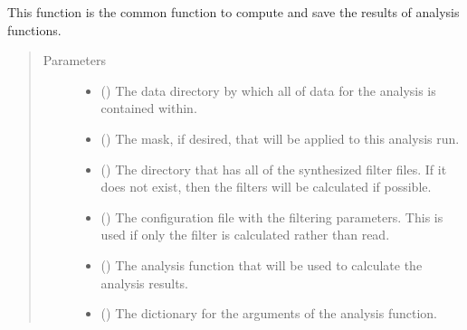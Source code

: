 \documentclass[letterpaper,10pt,english]{sphinxmanual}
\begin{document}
\begin{fulllineitems}
\label{\detokenize{docstrings/ifa_smeargle.analysis.base_functions:ifa_smeargle.analysis.base_functions.create_directory_analysis_files}}
This function is the common function to compute and save the
results of analysis functions.
\begin{quote}\begin{description}
\item[{Parameters}] \leavevmode\begin{itemize}
\item {} 
 () \textendash{} The data directory by which all of data for the analysis
is contained within.

\item {} 
 () \textendash{} The mask, if desired, that will be applied to this analysis
run.

\item {} 
 () \textendash{} The directory that has all of the synthesized filter files.
If it does not exist, then the filters will be calculated if
possible.

\item {} 
 () \textendash{} The configuration file with the filtering parameters. This
is used if only the filter is calculated rather than read.

\item {} 
 () \textendash{} The analysis function that will be used to calculate the
analysis results.

\item {} 
 () \textendash{} The dictionary for the arguments of the analysis function.


\end{itemize}
\end{description}
\end{quote}
\end{fulllineitems}
\end{document}
